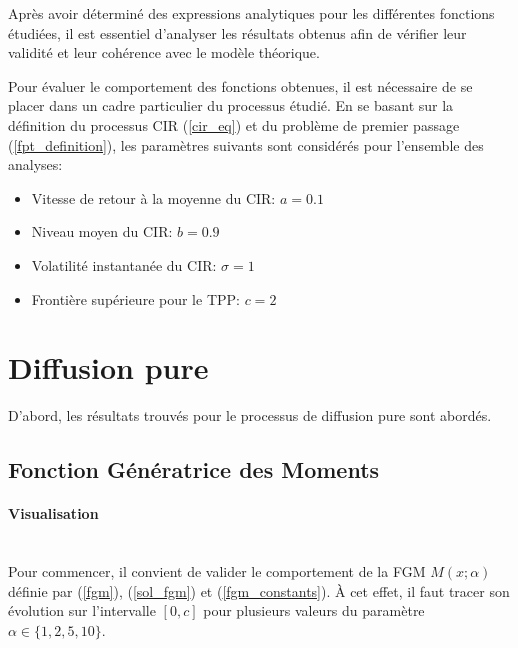 \label{sec:Theme2}

Après avoir déterminé des expressions analytiques pour les différentes fonctions étudiées, il est essentiel d'analyser les résultats obtenus afin de vérifier leur validité et leur cohérence avec le modèle théorique. 

Pour évaluer le comportement des fonctions obtenues, il est nécessaire de se placer dans un cadre particulier du processus étudié. En se basant sur la définition du processus \acs{CIR} (\ref{cir_eq}) et du problème de premier passage (\ref{fpt_definition}), les paramètres suivants sont considérés pour l'ensemble des analyses:

\begin{itemize}
    \item Vitesse de retour à la moyenne du \acs{CIR}: $a=0.1$
    \item Niveau moyen du \acs{CIR}: $b=0.9$
    \item Volatilité instantanée du \acs{CIR}: $\sigma=1$
    \item Frontière supérieure pour le \acs{TPP}: $c=2$
\end{itemize}

\section{Diffusion pure}

D'abord, les résultats trouvés pour le processus de diffusion pure sont abordés.

\subsection{Fonction Génératrice des Moments}

\paragraph{Visualisation}\phantom{}\\
Pour commencer, il convient de valider le comportement de la \acl{FGM} $M(x;\alpha)$ définie par (\ref{fgm}), (\ref{sol_fgm}) et (\ref{fgm_constants}). À cet effet, il faut tracer son évolution sur l'intervalle $[0, c]$ pour plusieurs valeurs du paramètre $\alpha \in \{1, 2, 5, 10\}$. 


